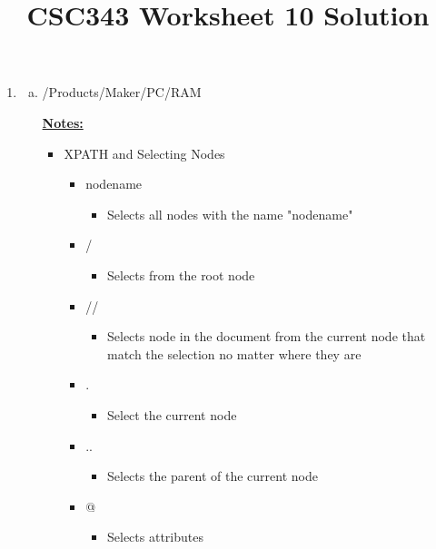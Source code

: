 \documentclass[12pt]{article}
\begin{document}
\title{CSC343 Worksheet 10 Solution}
\maketitle

\bigskip

\begin{enumerate}[1.]
    \item

    \begin{enumerate}[a)]

        \item /Products/Maker/PC/RAM

        \bigskip

        \underline{\textbf{Notes:}}

        \begin{itemize}
            \item XPATH and Selecting Nodes
            \begin{itemize}
                \item nodename
                \begin{itemize}
                    \item Selects all nodes with the name "nodename"
                \end{itemize}
                \item /
                \begin{itemize}
                    \item Selects from the root node
                \end{itemize}
                \item //
                \begin{itemize}
                    \item Selects node in the document from the current node that
                    match the selection no matter where they are
                \end{itemize}
                \item .
                \begin{itemize}
                    \item Select the current node
                \end{itemize}
                \item ..
                \begin{itemize}
                    \item Selects the parent of the current node
                \end{itemize}
                \item @
                \begin{itemize}
                    \item Selects attributes
                \end{itemize}
            \end{itemize}


\end{itemize}
\end{enumerate}
\end{enumerate}
\end{document}
